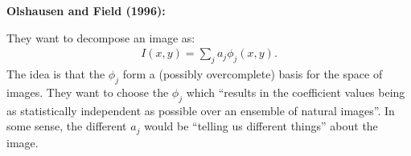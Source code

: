 \documentclass[12pt]{article}
\begin{document}
\textbf{Olshausen and Field (1996):} 

They want to decompose an image as:
\begin{eqnarray}
  I(x,y) = \sum_j a_j \phi_j(x,y).
\end{eqnarray}
The idea is that the $\phi_j$ form a (possibly overcomplete) basis for
the space of images.  They want to choose the $\phi_j$ which ``results
in the coefficient values being as statistically independent as
possible over an ensemble of natural images''.  In some sense, the
different $a_j$ would be ``telling us different things'' about the
image.
\end{document}
